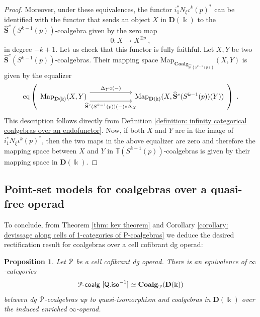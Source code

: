 \documentclass{proc-l}
\renewcommand{\mathcal}{\EuScript}
\theoremstyle{plain}
\newtheorem{proposition}[{theorem}]{Proposition}
\theoremstyle{definition}
\theoremstyle{remark}
\newcommand{\kk}{\Bbbk}
\begin{document}
\begin{proof}
Moreover, under these equivalences, the functor $i_1^*N_{\xi}\iota^k(p)^*$ can be identified with the functor that sends an object $X$ in $\mathbf{D}(\kk)$ to the $\widehat{\mathbf{S}}^c(S^{k-1}(p))$-coalgebra given by the zero map
\[
0: X \longrightarrow X^{\otimes p}~,
\]
in degree $-k+1$. Let us check that this functor is fully faithful. Let $X,Y$ be two $\widehat{\mathbf{S}}^c(S^{k-1}(p))$-coalgebras. Their mapping space $\mathrm{Map}_{\mathbf{Coalg}_{\widehat{\mathbf{S}}^c(S^{k-1}(p))}}(X,Y)$ is given by the equalizer
\[
\operatorname{eq}\left(
\begin{tikzcd}[column sep = 5pc]
\mathrm{Map}_{\mathbf{D}(\kk)}(X,Y) \arrow[r,shift left=0.5pc,"\Delta_Y \circ (-)"]\arrow[r,shift right=0.5pc,"\widehat{\mathbf{S}}^c(S^{k-1}(p))(-) \circ \Delta_X",swap]
&\mathrm{Map}_{\mathbf{D}(\kk)}(X,\widehat{\mathbf{S}}^c(S^{k-1}(p))(Y))
\end{tikzcd}\right)~.
\]
This description follows directly from Definition \ref{definition: infinity categorical coalgebras over an endofunctor}. Now, if both $X$ and $Y$ are in the image of $i_1^*N_{\xi}\iota^k(p)^*$, then the two maps in the above equalizer are zero and therefore the mapping space between $X$ and $Y$ in $\mathbb{T}(S^{k-1}(p))$-coalgebras is given by their mapping space in $\mathbf{D}(\kk)$.
\end{proof}

\subsection{Point-set models for coalgebras over a quasi-free operad}%
\label{Section:4.5}

To conclude, from Theorem \ref{thm: key theorem} and Corollary \ref{corollary: devissage along cells of 1-categories of P-coalgebras} we deduce the desired rectification result for coalgebras over a cell cofibrant dg operad:
\begin{proposition}%
\label{Proposition:4.16}\label{prop: rectification for cell cofibrant operads}
Let $\mathcal{P}$ be a cell cofibrant dg operad. There is an equivalence of $\infty$-categories
\[
\mathcal{P}\text{-}\mathsf{coalg}~[\mathsf{Q.iso}^{-1}] \simeq \mathbf{Coalg}_{\mathcal{P}}(\mathbf{D}(\kk))
\]
between dg $\mathcal{P}$-coalgebras up to quasi-isomorphism and coalgebras in $\mathbf{D}(\kk)$ over the induced enriched $\infty$-operad.
\end{proposition}
\end{document}
